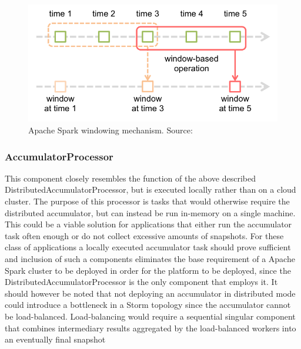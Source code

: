 \begin{figure}
\centering
\includegraphics[scale=0.55]{resources/img/spark-window.png}
\caption{Apache Spark windowing mechanism. Source: \cite{spark_user_guide}}
\label{fig:spark_window}
\end{figure}

\subsubsection*{AccumulatorProcessor}
This component closely resembles the function of the above described DistributedAccumulatorProcessor, but is executed locally rather than on a cloud cluster. The purpose of this processor is tasks that would otherwise require the distributed accumulator, but can instead be run in-memory on a single machine. This could be a viable solution for applications that either run the accumulator task often enough or do not collect excessive amounts of snapshots. For these class of applications a locally executed accumulator task should prove sufficient and inclusion of such a components eliminates the base requirement of a Apache Spark cluster to be deployed in order for the platform to be deployed, since the DistributedAccumulatorProcessor is the only component that employs it. It should however be noted that not deploying an accumulator in distributed mode could introduce a bottleneck in a Storm topology since the accumulator cannot be load-balanced. Load-balancing would require a sequential singular component that combines intermediary results aggregated by the load-balanced workers into an eventually final snapshot

